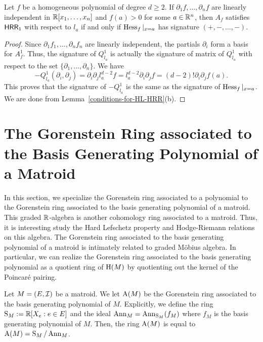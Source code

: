 \documentclass{puthesis-UG}
\begin{document}
\begin{cor} \label{partial-independent-implies-hessian}
	Let $f$ be a homogeneous polynomial of degree $d \geq 2$. If $\partial_1 f, \ldots, \partial_n f$ are linearly independent in $\mathbb{R}[x_1, \ldots, x_n]$ and $f(a) > 0$ for some $a \in \mathbb{R}^n$, then $A_f$ satisfies $\mathsf{HRR}_1$ with respect to $l_a$ if and only if $\operatorname{Hess}_f|_{x = a}$ has signature $(+, -, \ldots, -)$. 
\end{cor}

\begin{proof}
	Since $\partial_1 f_1, \ldots, \partial_n f_n$ are linearly independent, the partials $\partial_i$ form a basis for $A_f^1$. Thus, the signature of $Q_{l_a}^1$ is actually the signature of matrix of $Q_{l_a}^1$ with respect to the set $\{\partial_1, \ldots, \partial_n\}.$ We have 
	\[
		-Q_{l_a}^1(\partial_i, \partial_j) = \partial_i \partial_j l_a^{d-2} f =  l_a^{d-2} \partial_i \partial_j f = (d-2)! \partial_i \partial_j f(a).
	\]
	This proves that the signature of $-Q^1_{l_a}$ is the same as the signature of $\operatorname{Hess}_f |_{x = a}$.  We are done from Lemma~\ref{conditions-for-HL-HRR}(b).
\end{proof}

\section{The Gorenstein Ring associated to the Basis Generating Polynomial of a Matroid} \label{sec:gorenstein-ring-of-matroid}

In this section, we specialize the Gorenstein ring associated to a polynomial to the Gorenstein ring associated to the basis generating polynomial of a matroid. This graded $\mathbb{R}$-algebra is another cohomology ring associated to a matroid. Thus, it is interesting study the Hard Lefschetz property and Hodge-Riemann relations on this algebra. The Gorenstein ring associated to the basis generating polynomial of a matroid is intimately related to graded M\"obius algebra. In particular, we can realize the Gorenstein ring associated to the basis generating polynomial as a quotient ring of $\operatorname{H}(M)$ by quotienting out the kernel of the Poincar\'e pairing.

\begin{defn} \label{defn:basis-cohomology}
	Let $M = (E, \mathcal{I})$ be a matroid. We let $\operatorname{A}(M)$ be the Gorenstein ring associated to the basis generating polynomial of $M$. Explicitly, we define the ring $\operatorname{S}_M := \mathbb{R} [X_e : e \in E]$ and the ideal $\operatorname{Ann}_M = \operatorname{Ann}_{\operatorname{S}_M}(f_M)$ where $f_M$ is the basis generating polynomial of $M$. Then, the ring $\operatorname{A}(M)$ is equal to $\operatorname{A}(M) = \operatorname{S}_M / \operatorname{Ann}_M$.
\end{defn}
\end{document}
